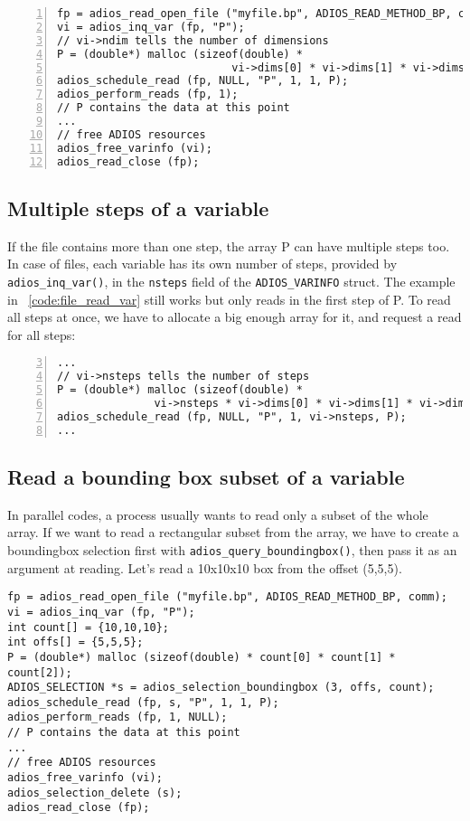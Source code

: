 \begin{lstlisting}[numbers=left, numberstyle=\color{gray}, stepnumber=2,
                             caption={Read a complete array from a file}, label=code:file_read_var]
fp = adios_read_open_file ("myfile.bp", ADIOS_READ_METHOD_BP, comm);
vi = adios_inq_var (fp, "P");
// vi->ndim tells the number of dimensions
P = (double*) malloc (sizeof(double) * 
                           vi->dims[0] * vi->dims[1] * vi->dims[2]);
adios_schedule_read (fp, NULL, "P", 1, 1, P);
adios_perform_reads (fp, 1);   
// P contains the data at this point
...
// free ADIOS resources
adios_free_varinfo (vi); 
adios_read_close (fp);
\end{lstlisting}


\subsection{Multiple steps of a variable}
 If the file contains more than one step, the array P can have multiple steps too. In case of files, each variable has its own number of steps, provided by \verb+adios_inq_var()+, in the \verb+nsteps+ field of the \verb+ADIOS_VARINFO+ struct. The example in \lstlistingname~\ref{code:file_read_var} still works but only reads in the first step of P. To read all steps at once, we have to allocate a big enough array for it, and request a read for all steps:

\begin{lstlisting}[frame=no, emph={nsteps}, emphstyle={\color{red}\large\bf},
                             numbers=left, numberstyle=\color{gray}, stepnumber=2,firstnumber=3]
...
// vi->nsteps tells the number of steps
P = (double*) malloc (sizeof(double) * 
               vi->nsteps * vi->dims[0] * vi->dims[1] * vi->dims[2]);
adios_schedule_read (fp, NULL, "P", 1, vi->nsteps, P);
...
\end{lstlisting}


\subsection{Read a bounding box subset of a variable}
In parallel codes, a process usually wants to read only a subset of the whole array. If we want to read a rectangular subset from the array, we have to create a boundingbox selection first with \verb+adios_query_boundingbox()+, then pass it as an argument at reading. Let's read a 10x10x10 box from the offset (5,5,5). 


\begin{lstlisting}[numbers=none,
                             caption={Read a bounding box of a variable},  label=code:boundingbox]
fp = adios_read_open_file ("myfile.bp", ADIOS_READ_METHOD_BP, comm);
vi = adios_inq_var (fp, "P");
int count[] = {10,10,10};
int offs[] = {5,5,5};
P = (double*) malloc (sizeof(double) * count[0] * count[1] * count[2]);
ADIOS_SELECTION *s = adios_selection_boundingbox (3, offs, count);
adios_schedule_read (fp, s, "P", 1, 1, P);
adios_perform_reads (fp, 1, NULL);   
// P contains the data at this point
...
// free ADIOS resources
adios_free_varinfo (vi); 
adios_selection_delete (s); 
adios_read_close (fp);
\end{lstlisting}


